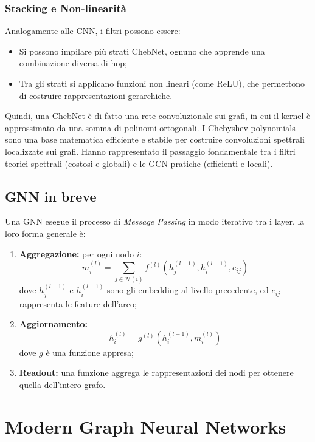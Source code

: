 \subsubsection{Stacking e Non-linearità}

Analogamente alle CNN, i filtri possono essere:
\begin{itemize}
  \item Si possono impilare più strati ChebNet, ognuno che apprende una combinazione diversa di hop;
  \item Tra gli strati si applicano funzioni non lineari (come ReLU), che permettono di costruire rappresentazioni gerarchiche.
\end{itemize}
Quindi, una ChebNet è di fatto una rete convoluzionale sui grafi, in cui il kernel è approssimato da una somma di polinomi ortogonali. I Chebyshev polynomials sono una base matematica efficiente e stabile per costruire convoluzioni spettrali localizzate sui grafi. Hanno rappresentato il passaggio fondamentale tra i filtri teorici spettrali (costosi e globali) e le GCN pratiche (efficienti e locali).

\subsection{GNN in breve}

Una GNN esegue il processo di \textit{Message Passing} in modo iterativo tra i layer, la loro forma generale è:

\begin{enumerate}
    \item \textbf{Aggregazione:} per ogni nodo \( i \):
    \[
        m_i^{(l)} = \sum_{j\in \mathcal{N}(i)} f^{(l)}(h_j^{(l-1)}, h_i^{(l-1)}, e_{ij})
    \]
    dove \( h_j^{(l-1)} \) e \( h_i^{(l-1)} \) sono gli embedding al livello precedente, ed \( e_{ij} \) rappresenta le feature dell’arco;
    \item \textbf{Aggiornamento:}
    \[
        h_i^{(l)} = g^{(l)}(h_i^{(l-1)}, m_i^{(l)})
    \]
    dove \( g \) è una funzione appresa;
    \item \textbf{Readout:} una funzione aggrega le rappresentazioni dei nodi per ottenere quella dell’intero grafo.
\end{enumerate}

\section{Modern Graph Neural Networks}

